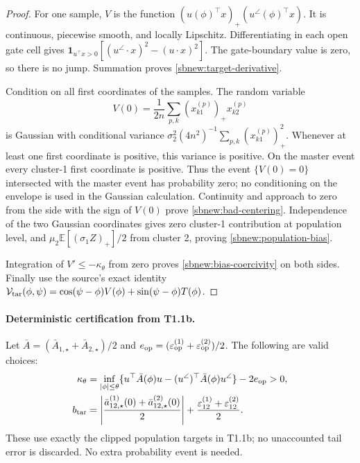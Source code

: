 \documentclass{article} %
\theoremstyle{plain}
\theoremstyle{definition}
\theoremstyle{remark}
\begin{document}
\begin{proof}
For one sample, $V$ is the function
$(u(\phi)^\top x)_+(u^\angle(\phi)^\top x)$. It is continuous,
piecewise smooth, and locally Lipschitz. Differentiating in each open gate
cell gives
$\mathbf1_{u^\top x>0}[(u^\angle\cdot x)^2-(u\cdot x)^2]$.
The gate-boundary value is zero, so there is no jump. Summation proves
\eqref{sbnew:target-derivative}.

Condition on all first coordinates of the samples. The random variable
\[
 V(0)=\frac1{2n}\sum_{p,k}(x_{k1}^{(p)})_+x_{k2}^{(p)}
\]
is Gaussian with conditional variance
$\sigma_2^2(4n^2)^{-1}\sum_{p,k}(x_{k1}^{(p)})_+^2$.
Whenever at least one first coordinate is positive, this variance is
positive. On the master event every cluster-1 first coordinate is positive.
Thus the event $\{V(0)=0\}$ intersected with the master event has probability
zero; no conditioning on the envelope is used in the Gaussian calculation.
Continuity and approach to zero from the side with the sign of $V(0)$
prove \eqref{sbnew:bad-centering}. Independence of the two Gaussian
coordinates gives zero cluster-1 contribution at population level, and
$\mu_2\mathbb E[(\sigma_1 Z)_+]/2$ from cluster 2, proving
\eqref{sbnew:population-bias}.

Integration of $V'\le-\kappa_\theta$ from zero proves
\eqref{sbnew:bias-coercivity} on both sides. Finally use the source's exact
identity $\mathcal V_{\rm tar}(\phi,\psi)
=\cos(\psi-\phi)V(\phi)+\sin(\psi-\phi)T(\phi)$.
\end{proof}

\paragraph{Deterministic certification from T1.1b.}
Let $\bar A=(\bar A_{1,\star}+\bar A_{2,\star})/2$ and
$e_{\rm op}=(\varepsilon_{\rm op}^{(1)}+
\varepsilon_{\rm op}^{(2)})/2$. The following are valid choices:
\begin{align}
 \kappa_\theta&=
 \inf_{|\phi|\le\theta}
 \{u^\top\bar A(\phi)u-(u^\angle)^\top\bar A(\phi)u^\angle\}
 -2e_{\rm op}>0,\label{sbnew:kappa-cert}\\
 b_{\rm tar}&=
 \left|\frac{\bar a_{12,\star}^{(1)}(0)+
 \bar a_{12,\star}^{(2)}(0)}2\right|
 +\frac{\varepsilon_{12}^{(1)}+\varepsilon_{12}^{(2)}}2.
 \label{sbnew:bias-cert}
\end{align}
These use exactly the clipped population targets in T1.1b; no unaccounted
tail error is discarded. No extra probability event is needed.
\end{document}
